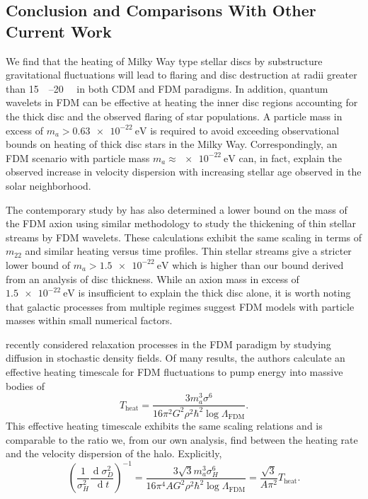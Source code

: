 \documentclass[usenatbib]{mnras}
\renewcommand{\d}[1]{\! \mathrm{d}#1 \:}
\newcommand{\deriv}[2]{\frac{\d{#1}}{\d{#2}}}
\renewcommand{\d}[1]{\ensuremath{\operatorname{d}\!{#1}}}
\begin{document}
\subsection{Conclusion and Comparisons With Other Current Work}

We find that the heating of Milky Way type stellar discs by substructure gravitational fluctuations will lead to flaring and disc destruction at radii greater than \SIrange{15}{20}{\kilo\parsec} in both CDM and FDM paradigms. In addition, quantum wavelets in FDM can be effective at heating the inner disc regions accounting for the thick disc and the observed flaring of star populations. A particle mass in excess of $m_a > \SI{0.63 e-22}{\electronvolt}$ is required to avoid exceeding observational bounds on heating of thick disc stars in the Milky Way. Correspondingly, an FDM scenario with particle mass $m_a \approx \SI{e-22}{\electronvolt}$ can, in fact, explain the observed increase in velocity dispersion with increasing stellar age observed in the solar neighborhood.  
\par
The contemporary study by \cite{stellar_streams_bound} has also determined a lower bound on the mass of the FDM axion using similar methodology to study the thickening of thin stellar streams by FDM wavelets. These calculations exhibit the same scaling in terms of $m_{22}$ and similar heating versus time profiles. Thin stellar streams give a stricter lower bound of $m_a > \SI{1.5 e-22}{\electronvolt}$ which is higher than our bound derived from an analysis of disc thickness. While an axion mass in excess of $\SI{1.5 e-22}{\electronvolt}$ is insufficient to explain the thick disc alone, it is worth noting that galactic processes from multiple regimes suggest FDM models with particle masses within small numerical factors.    
\par 
\cite{relaxation} recently considered relaxation processes in the FDM paradigm by studying diffusion in stochastic density fields. Of many results, the authors calculate an effective heating timescale for FDM fluctuations to pump energy into massive bodies of
\begin{equation}
T_{\text{heat}} = \frac{3 m_a^3 \sigma^6}{16 \pi^2 G^2 \rho^2 \hbar^2 \log{\Lambda_{\text{FDM}}}} .
\end{equation}  
This effective heating timescale exhibits the same scaling relations and is comparable to the ratio we, from our own analysis, find between the heating rate and the velocity dispersion of the halo. Explicitly,
\begin{equation}
\left( \frac{1}{\sigma_H^2} \deriv{\sigma_D^2}{t} \right)^{-1} = \frac{3 \sqrt{3} m_a^3 \sigma_H^6}{16 \pi^4 A G^2 \rho^2 \hbar^2 \log{\Lambda_{\text{FDM}}}} = \frac{\sqrt{3} }{A \pi^2} T_{\text{heat}}.
\end{equation}
\end{document}
